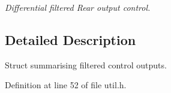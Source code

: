 \begin{DoxyCompactItemize}
\begin{DoxyCompactList}\small\item\em Differential filtered Rear output control. \end{DoxyCompactList}\end{DoxyCompactItemize}


\subsection{Detailed Description}
Struct summarising filtered control outputs. 

Definition at line 52 of file util.\+h.

